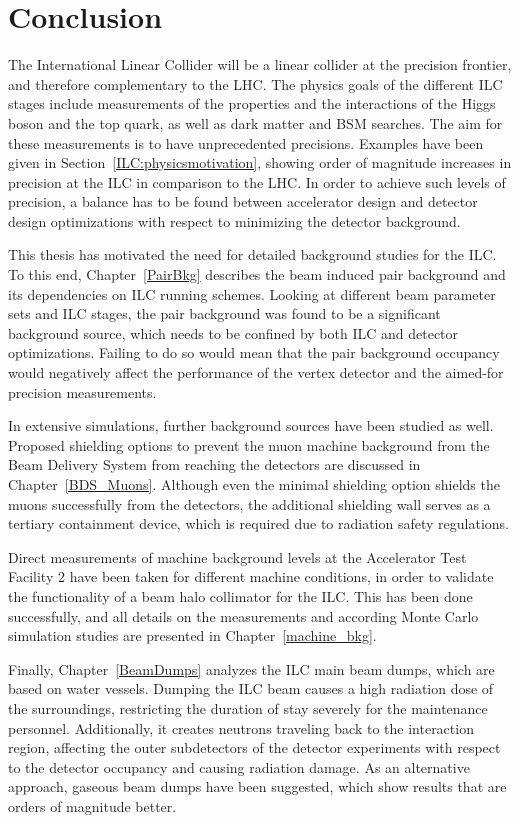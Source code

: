 \chapter{Conclusion}
\label{Conclusion}
The International Linear Collider will be a linear \positron\electron collider at the precision frontier, and therefore complementary to the LHC.
The physics goals of the different ILC stages include measurements of the properties and the interactions of the Higgs boson and the top quark, as well as dark matter and BSM searches.
The aim for these measurements is to have unprecedented precisions.
Examples have been given in Section~\ref{ILC:physicsmotivation}, showing order of magnitude increases in precision at the ILC in comparison to the LHC.
In order to achieve such levels of precision, a balance has to be found between accelerator design and detector design optimizations with respect to minimizing the detector background.

This thesis has motivated the need for detailed background studies for the ILC.
To this end, Chapter~\ref{PairBkg} describes the beam induced \positron\electron pair background and its dependencies on ILC running schemes.
Looking at different beam parameter sets and ILC stages, the pair background was found to be a \mbox{significant} background source, which needs to be confined by both ILC and detector optimizations.
Failing to do so would mean that the pair background occupancy would negatively affect the performance of the vertex detector and the aimed-for precision measurements.

In extensive simulations, further background sources have been studied as well.
Proposed shielding options to prevent the muon machine background from the Beam Delivery System from reaching the detectors are discussed in Chapter~\ref{BDS_Muons}.
Although even the minimal shielding option shields the muons successfully from the detectors, the additional shielding wall serves as a tertiary containment device, which is required due to radiation safety regulations.

Direct measurements of machine background levels at the Accelerator Test Facility 2 have been taken for different machine conditions, in order to validate the functionality of a beam halo collimator for the ILC.
This has been done successfully, and all details on the measurements and according Monte Carlo simulation studies are presented in Chapter~\ref{machine_bkg}.

Finally, Chapter~\ref{BeamDumps} analyzes the ILC main beam dumps, which are based on water vessels.
Dumping the ILC beam causes a high radiation dose of the surroundings, restricting the duration of stay severely for the maintenance personnel.
Additionally, it creates neutrons traveling back to the interaction region, affecting the outer subdetectors of the detector experiments with respect to the detector occupancy and causing radiation damage.
As an alternative approach, gaseous beam dumps have been suggested, which show results that are orders of magnitude better.

